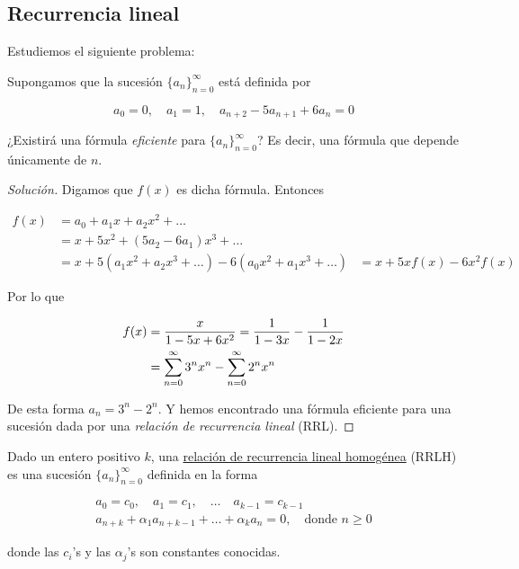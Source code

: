 \subsection{Recurrencia lineal}

Estudiemos el siguiente problema:

\begin{pro}
    Supongamos que la sucesión $\{a_n\}_{n=0}^{\infty}$ está definida por
    
    \[
    a_0 = 0, \quad a_1 = 1, \quad a_{n+2} - 5a_{n+1} + 6a_n = 0
    \]
    
    ¿Existirá una fórmula \textit{eficiente} para $\{a_n\}_{n=0}^{\infty}$? Es decir, una fórmula que depende únicamente de $n$.
\end{pro}

\begin{proof}[Solución]
    Digamos que $f(x)$ es dicha fórmula. Entonces
    
    \begin{align*}
        f(x) &= a_0 + a_1x + a_2x^2 + \dots \\
             &= x + 5x^2 + (5a_2 - 6a_1)x^3 + \dots \\
             &= x + 5(a_1x^2 + a_2x^3 + \dots) - 6(a_0x^2 + a_1x^3 + \dots)
             &= x + 5xf(x) - 6x^2f(x)
    \end{align*}
    
    Por lo que
    
    \begin{align*}
        f(x) &= \frac{x}{1 - 5x + 6x^2} = \frac{1}{1-3x} - \frac{1}{1-2x} \\
             &= \sum_{n=0}^{\infty} 3^nx^n - \sum_{n=0}^{\infty} 2^nx^n
    \end{align*}
    
    De esta forma $a_n = 3^n - 2^n$. Y hemos encontrado una fórmula eficiente para una sucesión dada por una \textit{relación de recurrencia lineal} (RRL).
\end{proof}

\begin{defn}
    Dado un entero positivo $k$, una \ul{relación de recurrencia lineal homogénea} (RRLH) es una sucesión $\{a_n\}_{n=0}^{\infty}$ definida en la forma
    
    \begin{gather*}
        a_0 = c_0, \quad a_1 = c_1, \quad \dots \quad a_{k-1} = c_{k-1} \\
        a_{n+k} + \alpha_1a_{n+k-1} + \dots + \alpha_ka_{n} = 0, \quad \text{donde $n \geq 0$}
    \end{gather*}
    
    \noindent donde las $c_i$'s y las $\alpha_j$'s son constantes conocidas.
\end{defn}

